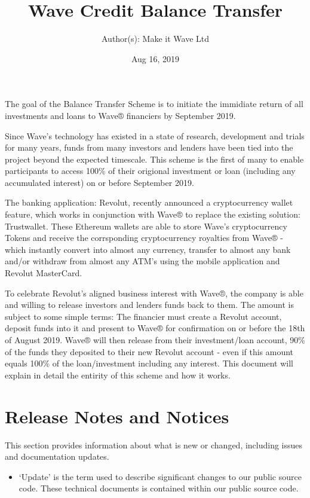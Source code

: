 \documentclass[letterpaper,10pt,openany,oneside,english]{sphinxmanual}
\title{Wave Credit Balance Transfer}
\date{Aug 16, 2019}
\author{Author(s): Make it Wave Ltd}
\begin{document}
\maketitle
\sphinxtableofcontents
{}\label{\detokenize{index::doc}}


The goal of the Balance Transfer Scheme is to initiate the immidiate return of all investments and loans to Wave® financiers by September 2019.

Since Wave’s technology has existed in a state of research, development and trials for many years, funds from many investors and lenders have been tied into the project beyond the expected timescale. This scheme is the first of many to enable participants to access 100\% of their origional investment or loan (including any accumulated interest) on or before September 2019.

The banking application: Revolut, recently announced a cryptocurrency wallet feature, which works in conjunction with Wave® to replace the existing solution: Trustwallet. These Ethereum wallets are able to store Wave’s cryptocurrency Tokens and receive the corrsponding cryptocurrency royalties from Wave® - which instantly convert into almost any currency, transfer to almost any bank and/or withdraw from almost any ATM’s using the mobile application and Revolut MasterCard.

To celebrate Revolut’s aligned business interest with Wave®, the company is able and willing to release investors and lenders funds back to them. The amount is subject to some simple terms: The financier must create a Revolut account, deposit funds into it and present to Wave® for confirmation on or before the 18th of August 2019. Wave® will then release from their investment/loan account, 90\% of the funds they deposited to their new Revolut account - even if this amount equals 100\% of the loan/investment including any interest. This document will explain in detail the entirity of this scheme and how it works.


\chapter{Release Notes and Notices}
\label{\detokenize{releasenotes:release-notes-and-notices}}\label{\detokenize{releasenotes::doc}}
This section provides information about what is new or changed, including issues and documentation updates.
\begin{itemize}
\item {} 
‘Update’ is the term used to describe significant changes to our public source code. These technical documents is contained within our public source code.

\end{itemize}
\end{document}
